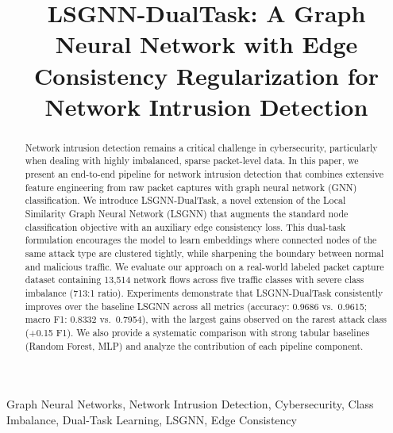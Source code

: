 \documentclass[conference]{IEEEtran}
\begin{document}
\title{LSGNN-DualTask: A Graph Neural Network with Edge Consistency Regularization for Network Intrusion Detection}

\author{
}

\maketitle

\begin{abstract}
Network intrusion detection remains a critical challenge in cybersecurity, particularly when dealing with highly imbalanced, sparse packet-level data. In this paper, we present an end-to-end pipeline for network intrusion detection that combines extensive feature engineering from raw packet captures with graph neural network (GNN) classification. We introduce LSGNN-DualTask, a novel extension of the Local Similarity Graph Neural Network (LSGNN) that augments the standard node classification objective with an auxiliary edge consistency loss. This dual-task formulation encourages the model to learn embeddings where connected nodes of the same attack type are clustered tightly, while sharpening the boundary between normal and malicious traffic. We evaluate our approach on a real-world labeled packet capture dataset containing 13{,}514 network flows across five traffic classes with severe class imbalance (713:1 ratio). Experiments demonstrate that LSGNN-DualTask consistently improves over the baseline LSGNN across all metrics (accuracy: 0.9686 vs.\ 0.9615; macro F1: 0.8332 vs.\ 0.7954), with the largest gains observed on the rarest attack class (+0.15 F1). We also provide a systematic comparison with strong tabular baselines (Random Forest, MLP) and analyze the contribution of each pipeline component.
\end{abstract}

\begin{IEEEkeywords}
Graph Neural Networks, Network Intrusion Detection, Cybersecurity, Class Imbalance, Dual-Task Learning, LSGNN, Edge Consistency
\end{IEEEkeywords}

\end{document}
